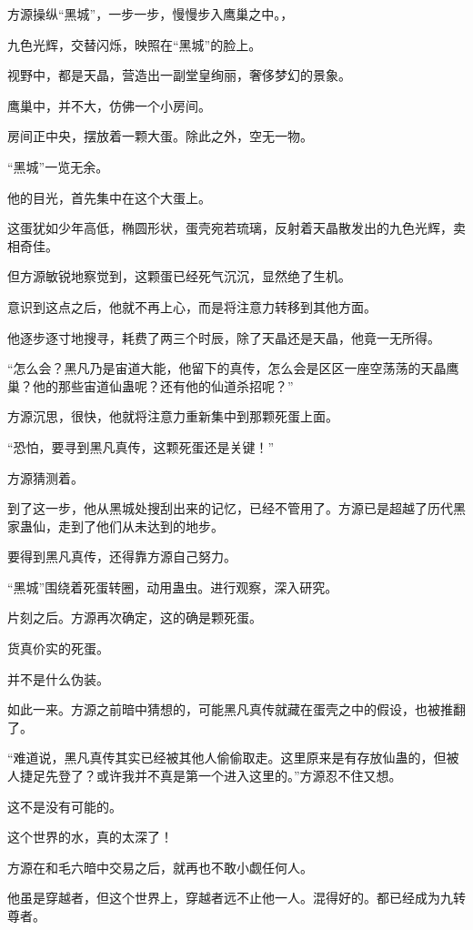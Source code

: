 
\begin{this_body}

方源操纵“黑城”，一步一步，慢慢步入鹰巢之中。，

九色光辉，交替闪烁，映照在“黑城”的脸上。

视野中，都是天晶，营造出一副堂皇绚丽，奢侈梦幻的景象。

鹰巢中，并不大，仿佛一个小房间。

房间正中央，摆放着一颗大蛋。除此之外，空无一物。

“黑城”一览无余。

他的目光，首先集中在这个大蛋上。

这蛋犹如少年高低，椭圆形状，蛋壳宛若琉璃，反射着天晶散发出的九色光辉，卖相奇佳。

但方源敏锐地察觉到，这颗蛋已经死气沉沉，显然绝了生机。

意识到这点之后，他就不再上心，而是将注意力转移到其他方面。

他逐步逐寸地搜寻，耗费了两三个时辰，除了天晶还是天晶，他竟一无所得。

“怎么会？黑凡乃是宙道大能，他留下的真传，怎么会是区区一座空荡荡的天晶鹰巢？他的那些宙道仙蛊呢？还有他的仙道杀招呢？”

方源沉思，很快，他就将注意力重新集中到那颗死蛋上面。

“恐怕，要寻到黑凡真传，这颗死蛋还是关键！”

方源猜测着。

到了这一步，他从黑城处搜刮出来的记忆，已经不管用了。方源已是超越了历代黑家蛊仙，走到了他们从未达到的地步。

要得到黑凡真传，还得靠方源自己努力。

“黑城”围绕着死蛋转圈，动用蛊虫。进行观察，深入研究。

片刻之后。方源再次确定，这的确是颗死蛋。

货真价实的死蛋。

并不是什么伪装。

如此一来。方源之前暗中猜想的，可能黑凡真传就藏在蛋壳之中的假设，也被推翻了。

“难道说，黑凡真传其实已经被其他人偷偷取走。这里原来是有存放仙蛊的，但被人捷足先登了？或许我并不真是第一个进入这里的。”方源忍不住又想。

这不是没有可能的。

这个世界的水，真的太深了！

方源在和毛六暗中交易之后，就再也不敢小觑任何人。

他虽是穿越者，但这个世界上，穿越者远不止他一人。混得好的。都已经成为九转尊者。


\end{this_body}
